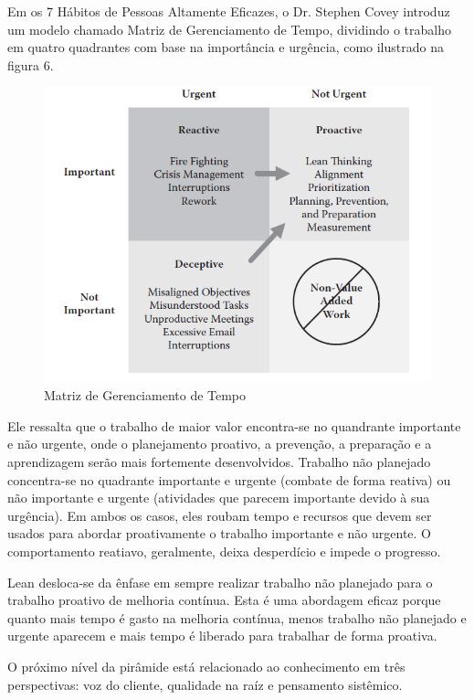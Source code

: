 \begin{anexosenv}
Em os 7 Hábitos de Pessoas Altamente Eficazes, o Dr. Stephen Covey introduz um modelo chamado Matriz de Gerenciamento de Tempo, dividindo o trabalho em quatro quadrantes com base na importância e urgência, como ilustrado na figura 6.

\begin{figure}[H]
		\centering
		\label{fig03}
			\includegraphics[scale=0.9]{figuras/matrizcomportamento.png}
		\caption{Matriz de Gerenciamento de Tempo \cite{bell2011}}
\end{figure}

Ele ressalta que o trabalho de maior valor encontra-se no quandrante importante e não urgente, onde o planejamento proativo, a prevenção, a preparação e a aprendizagem serão mais fortemente desenvolvidos. Trabalho não planejado concentra-se no quadrante importante e urgente (combate de forma reativa) ou não importante e urgente (atividades que parecem importante devido à sua urgência). Em ambos os casos, eles roubam tempo e recursos que devem ser usados para abordar proativamente o trabalho importante e não urgente. O comportamento reatiavo, geralmente, deixa desperdício e impede o progresso. 

Lean desloca-se da ênfase em sempre realizar trabalho não planejado para o trabalho proativo de melhoria contínua. Esta é uma abordagem eficaz porque quanto mais tempo é gasto na melhoria contínua, menos trabalho não planejado e urgente aparecem e mais tempo é liberado para trabalhar de forma proativa.

O próximo nível da pirâmide está relacionado ao conhecimento em três perspectivas: voz do cliente, qualidade na raíz e pensamento sistêmico.


\end{anexosenv}
